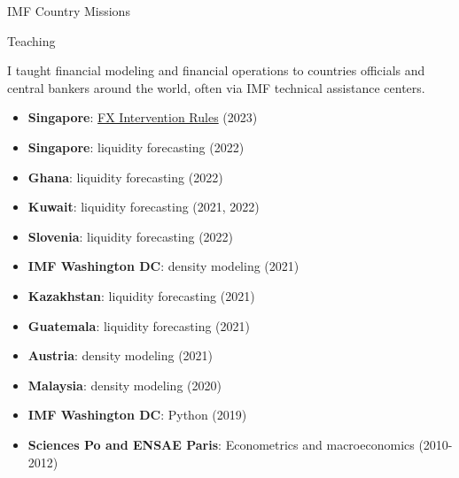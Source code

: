 \documentclass[usegeometry, 10pt, a4paper]{cv} %
\begin{document}
\begin{rubriquetableau}[0.95\textwidth]{IMF Country Missions}
\begin{multicols}{2}
\end{multicols}  
\end{rubriquetableau}


\vspace{0.5cm}

\begin{rubriquetableau}[0.95\textwidth]{Teaching}

  I taught financial modeling and financial operations to countries officials and central bankers around the world, often via IMF technical assistance centers. \\
  
  \begin{multicols}{2}
  
  \begin{itemize}
  \item \textbf{Singapore}: \href{https://romainlafarguette.github.io/fxinterventions/docs/index.html}{FX Intervention Rules} (2023)    
  \item \textbf{Singapore}: liquidity forecasting (2022)
  \item \textbf{Ghana}: liquidity forecasting (2022)
  \item \textbf{Kuwait}: liquidity forecasting (2021, 2022)
  \item \textbf{Slovenia}: liquidity forecasting (2022)
  \item \textbf{IMF Washington DC}: density modeling (2021)
  \item \textbf{Kazakhstan}: liquidity forecasting (2021)
  \item \textbf{Guatemala}: liquidity forecasting (2021)
  \item \textbf{Austria}: density modeling (2021)
  \item \textbf{Malaysia}: density modeling (2020)
  \item \textbf{IMF Washington DC}: Python (2019)
  \item \textbf{Sciences Po and ENSAE Paris}: Econometrics and macroeconomics (2010-2012)
  \end{itemize}
  
  \end{multicols}
\end{rubriquetableau}




\end{document}
